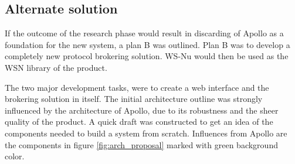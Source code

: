 \begin{table}[ht!]
\centering
{}
\caption{Risk analysis for building the system based on Apollo}
\label{tab:risk_analysis_apollo}
\end{table}

\subsection{Alternate solution}
\label{subsec:prestudies-alternate_solution}

If the outcome of the research phase would result in discarding of Apollo as a foundation for the new system, a plan B was outlined. Plan B was to develop a completely new protocol brokering solution. WS-Nu would then be used as the WSN library of the product. 

The two major development tasks, were to create a web interface and the brokering solution in itself. The initial architecture outline was strongly influenced by the architecture of Apollo, due to its robustness and the sheer quality of the product. A quick draft was constructed to get an idea of the components needed to build a system from scratch. Influences from Apollo are the components in figure \ref{fig:arch_proposal} marked with green background color.

